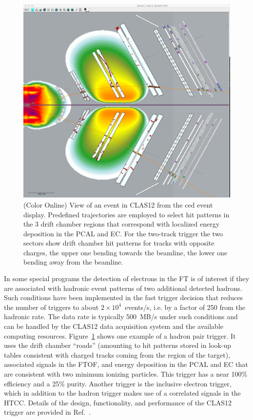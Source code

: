 \documentclass[final,3p,twocolumn]{elsarticle}
\begin{document}
\begin{figure}[htbp!]
\centerline{\includegraphics[width=0.95\columnwidth]{trigger.png}}
\caption{(Color Online) View of an event in CLAS12 from the ced event display. Predefined trajectories 
are employed to select hit
patterns in the 3 drift chamber regions that correspond with localized energy deposition
in the PCAL and EC. For the two-track trigger the two sectors show drift chamber hit patterns for tracks with
opposite charges, the upper one bending towards the beamline, the lower one bending away from the beamline.}
\label{trigger}
\end{figure}    

In some special programs the detection of electrons in the FT is of interest if they are associated with hadronic
event patterns of two additional detected hadrons. Such conditions have been implemented in the fast trigger
decision that reduces the number of triggers to about $2 \times 10^4$~events/s, i.e. by  a factor of 250 from the
hadronic rate. The data rate is typically 500~MB/s under such conditions and can be handled by the CLAS12 data
acquisition system and the available computing resources. Figure~\ref{trigger} shows one example of a hadron pair
trigger. It uses the drift chamber ``roads'' (amounting to hit patterns stored in look-up tables consistent with
charged tracks coming from the region of the target), associated signals in the FTOF, and energy deposition in the
PCAL and EC that are consistent with two minimum ionizing particles. This trigger has a near 100\% efficiency and a
25\% purity. Another trigger is the inclusive electron trigger, which in addition to the hadron trigger makes use of
a correlated signals in the HTCC. Details of the design, functionality, and performance of the CLAS12 trigger are
provided in Ref.~\cite{TRIG}. 
\end{document}
